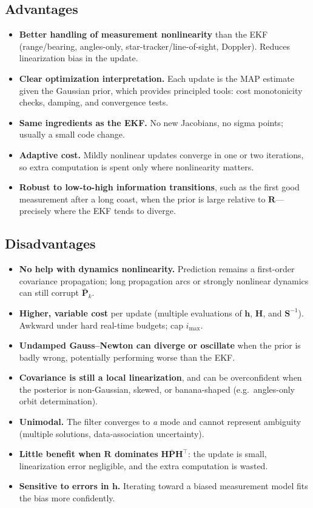 \documentclass[11pt]{article}
\newcommand{\meas}{\bm{h}}
\newcommand{\Hm}{\bm{H}}
\newcommand{\Pm}{\bm{P}}
\newcommand{\R}{\bm{R}}
\newcommand{\Sm}{\bm{S}}
\newcommand{\Pbar}{\bar{\Pm}}
\begin{document}
\subsection{Advantages}
\begin{itemize}
  \item \textbf{Better handling of measurement nonlinearity} than the EKF (range/bearing,
        angles-only, star-tracker/line-of-sight, Doppler). Reduces linearization bias in the
        update.
  \item \textbf{Clear optimization interpretation.} Each update is the MAP estimate given the
        Gaussian prior, which provides principled tools: cost monotonicity checks, damping, and
        convergence tests.
  \item \textbf{Same ingredients as the EKF.} No new Jacobians, no sigma points; usually a
        small code change.
  \item \textbf{Adaptive cost.} Mildly nonlinear updates converge in one or two iterations, so
        extra computation is spent only where nonlinearity matters.
  \item \textbf{Robust to low-to-high information transitions}, such as the first good
        measurement after a long coast, when the prior is large relative to $\R$---precisely
        where the EKF tends to diverge.
\end{itemize}

\subsection{Disadvantages}
\begin{itemize}
  \item \textbf{No help with dynamics nonlinearity.} Prediction remains a first-order
        covariance propagation; long propagation arcs or strongly nonlinear dynamics can still
        corrupt $\Pbar_k$.
  \item \textbf{Higher, variable cost} per update (multiple evaluations of $\meas$, $\Hm$, and
        $\Sm^{-1}$). Awkward under hard real-time budgets; cap $i_{\max}$.
  \item \textbf{Undamped Gauss--Newton can diverge or oscillate} when the prior is badly
        wrong, potentially performing worse than the EKF.
  \item \textbf{Covariance is still a local linearization}, and can be overconfident when the
        posterior is non-Gaussian, skewed, or banana-shaped (e.g.\ angles-only orbit
        determination).
  \item \textbf{Unimodal.} The filter converges to \emph{a} mode and cannot represent
        ambiguity (multiple solutions, data-association uncertainty).
  \item \textbf{Little benefit when $\R$ dominates} $\Hm\Pbar\Hm^\top$: the update is small,
        linearization error negligible, and the extra computation is wasted.
  \item \textbf{Sensitive to errors in $\meas$.} Iterating toward a biased measurement model fits
        the bias more confidently.
\end{itemize}
\end{document}

